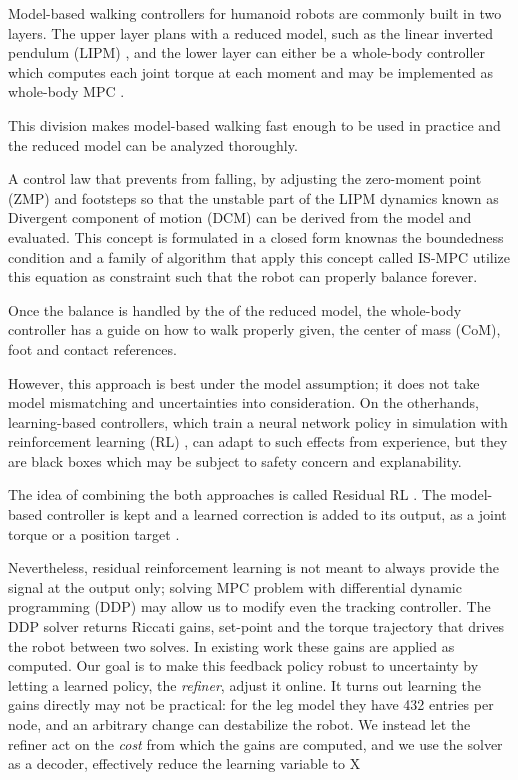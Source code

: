 \documentclass[conference]{IEEEtran}
\begin{document}
Model-based walking controllers for humanoid robots are commonly built in two layers.
The upper layer plans with a reduced model, such as the linear inverted pendulum (LIPM) \cite{kajita2001lipm,kajita2003preview}, and the lower layer can either be a whole-body controller which computes each joint torque at each moment and may be implemented as whole-body MPC \cite{mastalli2020crocoddyl,dantec2022wbmpc}.

This division makes model-based walking fast enough to be used in practice and the reduced model can be analyzed thoroughly.

A control law that prevents from falling, by adjusting the zero-moment point (ZMP) and footsteps so that the unstable part of the LIPM dynamics known as Divergent component of motion (DCM) \cite{takenaka2009dcm,englsberger2011capture} can be derived from the model and evaluated.
This concept is formulated in a closed form knownas the boundedness condition \cite{lanari2014boundedness} and a family of algorithm that apply this concept called IS-MPC\cite{scianca2020ismpc,dallard2025adios} utilize this equation as constraint such that the robot can properly balance forever.

Once the balance is handled by the of the reduced model, the whole-body controller has a guide on how to walk properly given, the center of mass (CoM), foot and contact references.

However, this approach is best under the model assumption; it does not take model mismatching and uncertainties into consideration.
On the otherhands, learning-based controllers, which train a neural network policy in simulation with reinforcement learning (RL) \cite{hwangbo2019learning,radosavovic2024humanoid}, can adapt to such effects from experience, but they are black boxes which may be subject to safety concern and explanability.

The idea of combining the both approaches is called Residual RL \cite{silver2018residual,johannink2019residual}. The model-based controller is kept and a learned correction is added to its output, as a joint torque or a position target \cite{jenelten2024dtc,jeon2025residualmpc}.

Nevertheless, residual reinforcement learning is not meant to always provide the signal at the output only; solving MPC problem with differential dynamic programming (DDP) \cite{mayne1966ddp} may allow us to modify even the tracking controller.
The DDP solver returns Riccati gains, set-point and the torque trajectory that drives the robot between two solves.
In existing work these gains are applied as computed.
Our goal is to make this feedback policy robust to uncertainty by letting a learned policy, the \emph{refiner}, adjust it online.
It turns out learning the gains directly may not be practical: for the leg model they have 432 entries per node, and an arbitrary change can destabilize the robot.
We instead let the refiner act on the \emph{cost} from which the gains are computed, and we use the solver as a decoder, effectively reduce the learning variable to X
\end{document}
